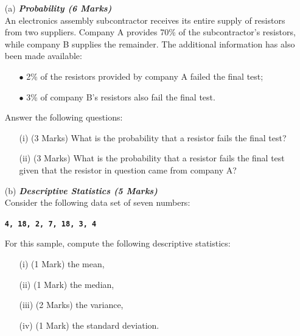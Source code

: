 \documentclass[a4paper,12pt]{article}
\begin{document}
\bigskip


\begin{itemize}
\item[(a)]  \textbf{\textit{Probability (6 Marks)}}\\
An electronics assembly subcontractor receives its entire supply of resistors from two suppliers. Company A provides 70\% of the subcontractor's resistors, while company B supplies the remainder. The additional information has also been made available:

\begin{itemize}
\item[{$\bullet$}] 2\% of the resistors provided by company A failed the final test;
\item[{$\bullet$}] 3\% of company B's resistors also fail the final test.
\end{itemize}
\noindent Answer the following questions:
\begin{itemize}
\item[(i)](3 Marks) What is the probability that a resistor fails the final test?
\item[(ii)](3 Marks)  What is the probability that a resistor fails the final test given that the resistor in question came from company A?
\end{itemize}

\item[(b)] \textbf{\textit{Descriptive Statistics (5 Marks)}}\\
Consider the following data set of seven numbers:

\begin{center}
\textbf{\texttt{4, 18,  2,  7, 18,  3,  4 }}
\end{center}

\noindent For this sample, compute the following descriptive statistics:
\begin{itemize}
\item[(i)] (1 Mark) the mean,
\item[(ii)] (1 Mark) the median,
\item[(iii)] (2 Marks) the variance,
\item[(iv)] (1 Mark) the standard deviation.
\end{itemize}
\end{itemize}
\end{document}
